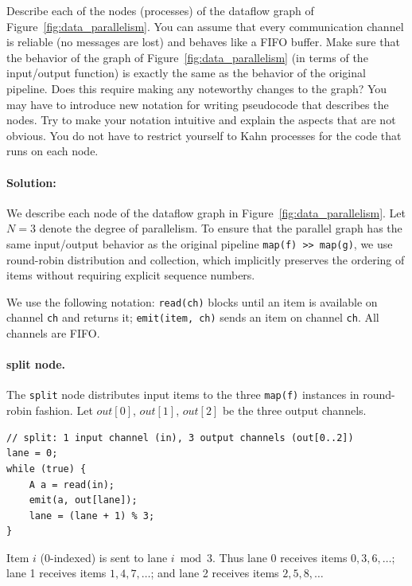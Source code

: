 \documentclass[11pt]{article}
\newcommand{\mnt}[1]{{\small\texttt{#1}}}
\theoremstyle{definition}
\begin{document}
Describe each of the nodes (processes) of the dataflow graph of Figure~\ref{fig:data_parallelism}. You can assume that every communication channel is reliable (no messages are lost) and behaves like a FIFO buffer. Make sure that the behavior of the graph of Figure~\ref{fig:data_parallelism} (in terms of the input/output function) is exactly the same as the behavior of the original pipeline. Does this require making any noteworthy changes to the graph? You may have to introduce new notation for writing pseudocode that describes the nodes. Try to make your notation intuitive and explain the aspects that are not obvious. You do not have to restrict yourself to Kahn processes for the code that runs on each node.

\paragraph{Solution:}

We describe each node of the dataflow graph in Figure~\ref{fig:data_parallelism}. Let $N = 3$ denote the degree of parallelism. To ensure that the parallel graph has the same input/output behavior as the original pipeline \mnt{map(f) >> map(g)}, we use round-robin distribution and collection, which implicitly preserves the ordering of items without requiring explicit sequence numbers.

We use the following notation: \mnt{read(ch)} blocks until an item is available on channel \mnt{ch} and returns it; \mnt{emit(item, ch)} sends an item on channel \mnt{ch}. All channels are FIFO.

\paragraph{split node.} The \mnt{split} node distributes input items to the three \mnt{map(f)} instances in round-robin fashion. Let $\mathit{out}[0]$, $\mathit{out}[1]$, $\mathit{out}[2]$ be the three output channels.

\begin{verbatim}
// split: 1 input channel (in), 3 output channels (out[0..2])
lane = 0;
while (true) {
    A a = read(in);
    emit(a, out[lane]);
    lane = (lane + 1) % 3;
}
\end{verbatim}

Item $i$ (0-indexed) is sent to lane $i \bmod 3$. Thus lane 0 receives items $0, 3, 6, \ldots$; lane 1 receives items $1, 4, 7, \ldots$; and lane 2 receives items $2, 5, 8, \ldots$
\end{document}
